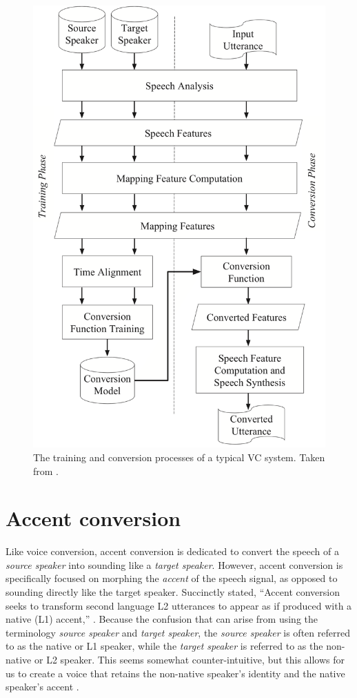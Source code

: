 \documentclass
[
    a4paper,
    twoside,
    12pt,
]
{report}
\begin{document}
\begin{figure}[]
\centering
\includegraphics[scale=0.25]{img/vc-flowchart.png}
\caption{The training and conversion processes of a typical VC system. Taken from \textcite{mohammadi2017}.}
\label{fig:vc-flowchart}
\end{figure}

\hypertarget{accent-conversion}{%
\section{Accent conversion}\label{accent-conversion}}

Like voice conversion, accent conversion is dedicated to convert the
speech of a \emph{source speaker} into sounding like a \emph{target
speaker}. However, accent conversion is specifically focused on morphing
the \emph{accent} of the speech signal, as opposed to sounding directly
like the target speaker. Succinctly stated, ``Accent conversion seeks to
transform second language L2 utterances to appear as if produced with a
native (L1) accent,'' \parencite{aryal2014a}. Because the confusion that
can arise from using the terminology \emph{source speaker} and
\emph{target speaker}, the \emph{source speaker} is often referred to as
the native or L1 speaker, while the \emph{target speaker} is referred to
as the non-native or L2 speaker. This seems somewhat counter-intuitive,
but this allows for us to create a voice that retains the non-native
speaker's identity and the native speaker's accent
\parencite{zhao2018a}.
\end{document}
